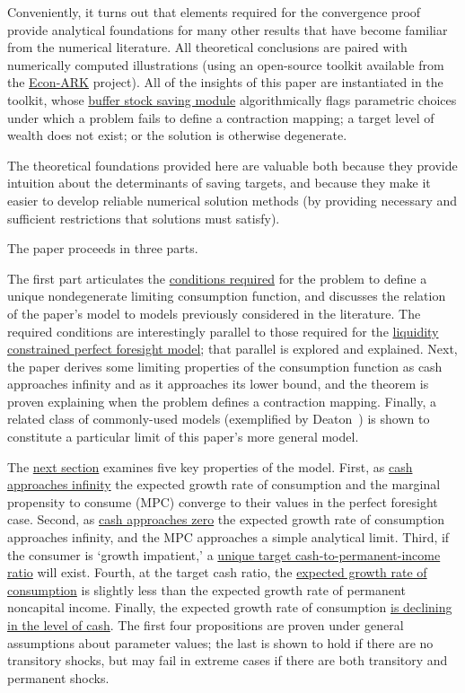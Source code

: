\documentclass[BufferStockTheory]{subfiles}
\begin{document}
Conveniently, it turns out that elements required for the convergence proof provide analytical foundations for many other results that have become familiar from the numerical literature.  All theoretical conclusions are paired with numerically computed illustrations (using an open-source toolkit available from the \href{https://github.com/econ-ark/REMARK/blob/master/REMARKs/BufferStockTheory/BufferStockTheory.ipynb}{Econ-ARK} project).  All of the insights of this paper are instantiated in the toolkit, whose \href{https://hark.readthedocs.io/en/stable/reference/ConsumptionSaving/ConsIndShockModel.html}{buffer stock saving module} algorithmically flags parametric choices under which a problem fails to define a contraction mapping; a target level of wealth does not exist; or the solution is otherwise degenerate.

The theoretical foundations provided here are valuable both because they provide intuition about the determinants of saving targets, and because they make it easier to develop reliable numerical solution methods (by providing necessary and sufficient restrictions that solutions must satisfy).

The paper proceeds in three parts.

The first part articulates the \hyperlink{Sufficient-Conditions}{conditions required} for the problem to define a unique nondegenerate limiting consumption function, and discusses the relation of the paper's model to models previously considered in the literature.  The required conditions are interestingly parallel to those required for the \hyperlink{Factors-Defined-And-Compared}{liquidity constrained perfect foresight model}; that parallel is explored and explained.  Next, the paper derives some limiting properties of the consumption function as cash approaches infinity and as it approaches its lower bound, and the theorem is proven explaining when the problem defines a contraction mapping.  Finally, a related class of commonly-used models (exemplified by Deaton~\citeyearpar{deatonLiqConstr}) is shown to constitute a particular limit of this paper's more general model.

The \hyperlink{AnalysisoftheConvergedConsumptionFunction}{next section} examines five key properties of the model. First, as \hyperlink{LimitsAsmtToInfty}{cash approaches infinity} the expected growth rate of consumption and the marginal propensity to consume (MPC) converge to their values in the perfect foresight case. Second, as \hyperlink{LimitsAsmtToZero}{cash approaches zero} the expected growth rate of consumption approaches infinity, and the MPC approaches a simple analytical limit.  Third, if the consumer is `growth impatient,' a \hyperlink{onetarget}{unique target cash-to-permanent-income ratio} will exist.  Fourth, at the target cash ratio, the \hyperlink{cGroLTpGro}{expected growth rate of consumption} is slightly less than the expected growth rate of permanent noncapital income.  Finally, the expected growth rate of consumption \hyperlink{dcgdxneg}{is declining in the level of cash}. The first four propositions are proven under general assumptions about parameter values; the last is shown to hold if there are no transitory shocks, but may fail in extreme cases if there are both transitory and permanent shocks.
\end{document}
